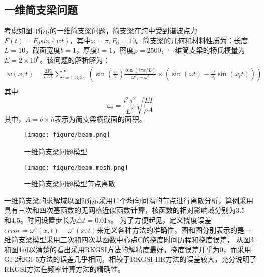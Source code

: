 \documentclass[a4paper]{article}
\begin{document}
\subsection{一维简支梁问题}
考虑如图1所示的一维简支梁问题，简支梁在跨中受到谐波点力$F(t)=F_0sin(wt)$，其中$\omega=\pi,F_0=10$。简支梁的几何和材料性质为：长度$L=10$，截面宽度$b=1$，厚度$t=1$，密度$\rho=2500$，一维简支梁的杨氏模量为$E=2\times10^6$。该问题的解析解为：
\begin{equation}
\begin{split}
    w(x,t) = \frac{{2{F_0}}}{{\rho AL}}\sum\limits_{i = 1,3,5...}^\infty  {(\sin (\frac{{i\pi }}{2})\frac{{\sin (i\pi x/L)}}{{{\omega ^2}_i - {\omega ^2}}} \times (\sin (\omega t) - \frac{\omega }{{{\omega _i}}}\sin ({\omega _i}t)))} \\ 
\end{split}
\end{equation}
其中
\begin{equation}
{\omega _i} = \frac{{{i^2}{\pi ^2}}}{{{L^2}}}\sqrt {\frac{{EI}}{{\rho A}}} 
\end{equation}
其中，$A=b\times h$表示为简支梁横截面的面积。\par
\begin{figure}[!h]
\centering
\texttt{[image: figure/beam.png]}
\caption{一维简支梁问题模型}
\end{figure}
\begin{figure}[!h]
\texttt{[image: figure/beam.mesh.png]}
\caption{一维简支梁问题模型节点离散}
\end{figure}
一维简支梁的求解域以图2所示采用11个均匀间隔的节点进行离散分析，算例采用具有三次和四次基函数的无网格近似函数计算，核函数的相对影响域分别为3.5\\和4.5。时间设置步长为$\triangle t=0.01s$。
为了方便起见，定义挠度误差$error=\omega^h(x,t)-\omega^{\varepsilon}(x,t)$来定义各种方法的准确性，图和图分别表示的是一维简支梁模型采用三次和四次基函数中心点C的挠度时间历程和挠度误差，
从图3和图4可以清楚的看出采用RKGSI方法的解精度最好，挠度误差几乎为0，而采用GI-2和GI-5方法的误差几乎相同，相较于RKGSI-HR方法的误差较大，充分说明了RKGSI方法在频率计算方法的精确性。
\end{document}
